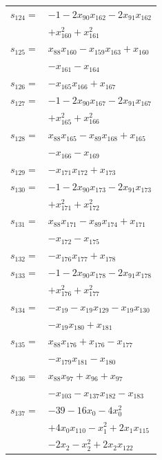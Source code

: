 \begin{longtable}{@{}r@{\;}l@{}}
\(s_{124}=\) & \(\displaystyle -1 -2x_{90}x_{162} -2x_{91}x_{162}\) \\
 & \(\displaystyle +x_{160}^{2} +x_{161}^{2}\) \\[3pt]
\(s_{125}=\) & \(\displaystyle x_{88}x_{160} -x_{159}x_{163} +x_{160}\) \\
 & \(\displaystyle -x_{161} -x_{164}\) \\[3pt]
\(s_{126}=\) & \(\displaystyle -x_{165}x_{166} +x_{167}\) \\[3pt]
\(s_{127}=\) & \(\displaystyle -1 -2x_{90}x_{167} -2x_{91}x_{167}\) \\
 & \(\displaystyle +x_{165}^{2} +x_{166}^{2}\) \\[3pt]
\(s_{128}=\) & \(\displaystyle x_{88}x_{165} -x_{89}x_{168} +x_{165}\) \\
 & \(\displaystyle -x_{166} -x_{169}\) \\[3pt]
\(s_{129}=\) & \(\displaystyle -x_{171}x_{172} +x_{173}\) \\[3pt]
\(s_{130}=\) & \(\displaystyle -1 -2x_{90}x_{173} -2x_{91}x_{173}\) \\
 & \(\displaystyle +x_{171}^{2} +x_{172}^{2}\) \\[3pt]
\(s_{131}=\) & \(\displaystyle x_{88}x_{171} -x_{89}x_{174} +x_{171}\) \\
 & \(\displaystyle -x_{172} -x_{175}\) \\[3pt]
\(s_{132}=\) & \(\displaystyle -x_{176}x_{177} +x_{178}\) \\[3pt]
\(s_{133}=\) & \(\displaystyle -1 -2x_{90}x_{178} -2x_{91}x_{178}\) \\
 & \(\displaystyle +x_{176}^{2} +x_{177}^{2}\) \\[3pt]
\(s_{134}=\) & \(\displaystyle -x_{19} -x_{19}x_{129} -x_{19}x_{130}\) \\
 & \(\displaystyle -x_{19}x_{180} +x_{181}\) \\[3pt]
\(s_{135}=\) & \(\displaystyle x_{88}x_{176} +x_{176} -x_{177}\) \\
 & \(\displaystyle -x_{179}x_{181} -x_{180}\) \\[3pt]
\(s_{136}=\) & \(\displaystyle x_{88}x_{97} +x_{96} +x_{97}\) \\
 & \(\displaystyle -x_{103} -x_{137}x_{182} -x_{183}\) \\[3pt]
\(s_{137}=\) & \(\displaystyle -39 -16x_{0} -4x_{0}^{2}\) \\
 & \(\displaystyle +4x_{0}x_{110} -x_{1}^{2} +2x_{1}x_{115}\) \\
 & \(\displaystyle -2x_{2} -x_{2}^{2} +2x_{2}x_{122}\) \\

\end{longtable}
